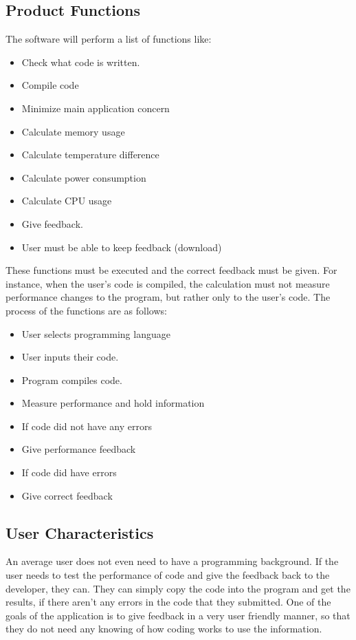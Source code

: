 \documentclass[a4paper,12pt]{article}
\begin{document}
\subsection{Product Functions}
The software will perform a list of functions like:
\begin{itemize}
\item Check what code is written.
\item Compile code
\item Minimize main application concern
\item Calculate memory usage
\item Calculate temperature difference
\item Calculate power consumption
\item Calculate CPU usage
\item Give feedback.
\item User must be able to keep feedback (download)
\end{itemize}
	
These functions must be executed and the correct feedback must be given. For instance, when the user's code is compiled, the calculation must not measure performance changes to the program, but rather only to the user's code. 
The process of the functions are as follows:
\begin{itemize}
\item User selects programming language
\item User inputs their code.
\item Program compiles code.
\item Measure performance and hold information
\item If code did not have any errors
\item Give performance feedback
\item If code did have errors
\item Give correct feedback
\end{itemize}



\subsection{User Characteristics}
An average user does not even need to have a programming background. If the user needs to test the performance of code and give the feedback back to the developer, they can. They can simply copy the code into the program and get the results, if there aren't any errors in the code that they submitted. One of the goals of the application is to give feedback in a very user friendly manner, so that they do not need any knowing of how coding works to use the information. 
\end{document}
